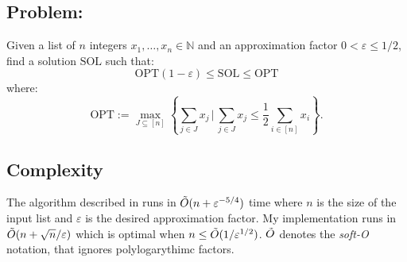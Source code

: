 \subsection{\ApxPartition Problem:}
Given a list of \(n\) integers \(x_1, \ldots, x_n \in \mathbb{N}\) and an approximation factor \(0 < \varepsilon \le 1/2\), find a solution $\text{SOL}$ such that:
\[
    \text{OPT}(1-\varepsilon) \le \text{SOL} \le \text{OPT}
\]
where:
\[
    \text{OPT} := \max_{J \subseteq [n]} \left\{ \sum_{j \in J} x_j \, \bigg| \, \sum_{j \in J} x_j \leq \frac{1}{2} \sum_{i \in [n]} x_i \right\}.
\]



\subsection{Complexity}
The algorithm described in \cite{deng} runs in \(\tilde{O}(n + \varepsilon^{-5/4})\) time where \(n\) is the size of the input list and \(\varepsilon\) is the desired approximation factor. My implementation runs in \(\tilde{O}(n + \sqrt{n}/\varepsilon)\) which is optimal when $n \le \tilde{O}(1/\varepsilon^{1/2})$. $\tilde{O}$ denotes the \textit{soft-O} notation, that ignores polylogarythimc factors.





